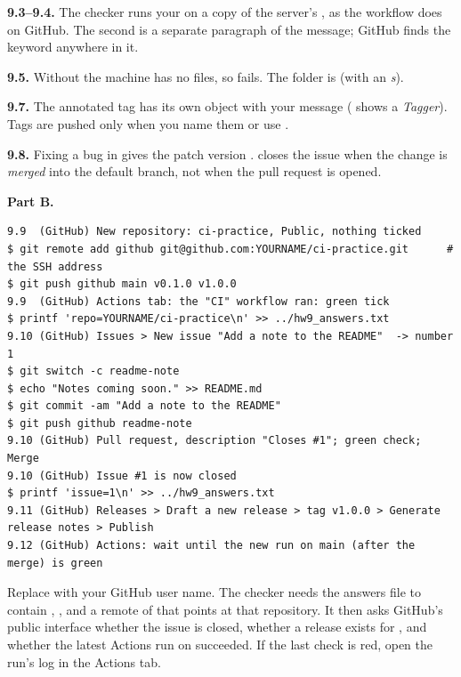 \textbf{9.3--9.4.} The checker runs your  on a copy of the server's , as the workflow does on GitHub. The second  is a separate paragraph of the message; GitHub finds the keyword anywhere in it.

\textbf{9.5.} Without  the machine has no files, so  fails. The folder is  (with an \emph{s}).

\textbf{9.7.} The annotated tag has its own object with your message ( shows a \emph{Tagger}). Tags are pushed only when you name them or use .

\textbf{9.8.} Fixing a bug in  gives the patch version .  closes the issue when the change is \emph{merged} into the default branch, not when the pull request is opened.

\textbf{Part B.}

\begin{lstlisting}
9.9  (GitHub) New repository: ci-practice, Public, nothing ticked
$ git remote add github git@github.com:YOURNAME/ci-practice.git      # the SSH address
$ git push github main v0.1.0 v1.0.0
9.9  (GitHub) Actions tab: the "CI" workflow ran: green tick
$ printf 'repo=YOURNAME/ci-practice\n' >> ../hw9_answers.txt
9.10 (GitHub) Issues > New issue "Add a note to the README"  -> number 1
$ git switch -c readme-note
$ echo "Notes coming soon." >> README.md
$ git commit -am "Add a note to the README"
$ git push github readme-note
9.10 (GitHub) Pull request, description "Closes #1"; green check; Merge
9.10 (GitHub) Issue #1 is now closed
$ printf 'issue=1\n' >> ../hw9_answers.txt
9.11 (GitHub) Releases > Draft a new release > tag v1.0.0 > Generate release notes > Publish
9.12 (GitHub) Actions: wait until the new run on main (after the merge) is green
\end{lstlisting}

Replace  with your GitHub user name. The checker needs the answers file to contain , , and a remote of  that points at that repository. It then asks GitHub's public interface whether the issue is closed, whether a release exists for , and whether the latest Actions run on  succeeded. If the last check is red, open the run's log in the Actions tab.


